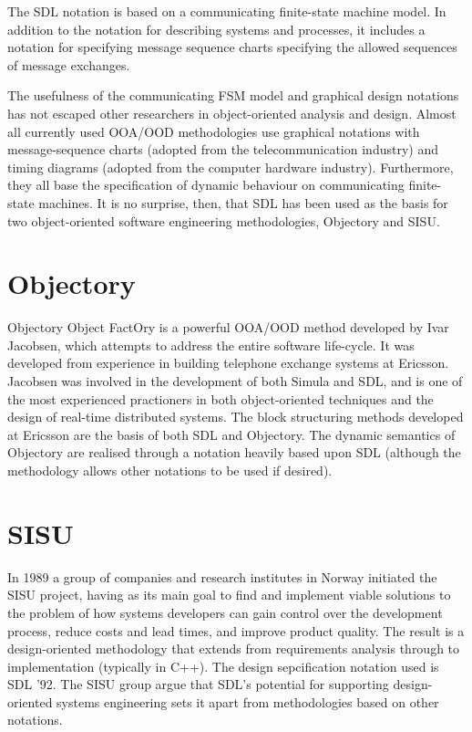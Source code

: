 The SDL notation is based on a communicating finite-state machine model.
In addition to the notation for describing systems and processes,
it includes a notation for specifying message sequence charts specifying the
allowed sequences of message exchanges. 

The usefulness of the communicating FSM model and
graphical design notations has not
escaped other researchers in object-oriented analysis and design. Almost
all currently used OOA/OOD methodologies use graphical notations with
message-sequence charts (adopted from the telecommunication industry)
and timing diagrams (adopted from the computer hardware industry).
Furthermore, they all base the specification of dynamic behaviour on
communicating finite-state machines.
It is no surprise, then, that SDL has been used as the basis for
two object-oriented software engineering methodologies, 
Objectory\cite{objectory} and SISU\cite{sisu}.

\section{Objectory}

Objectory {Object FactOry} is a powerful OOA/OOD method developed by Ivar 
Jacobsen, which attempts to address the entire software 
life-cycle. It was developed from experience in building telephone exchange 
systems at Ericsson. Jacobsen was involved in the development of both 
Simula and SDL, and is one of the most experienced practioners in both
object-oriented techniques and the design of real-time distributed 
systems. The block structuring methods developed at Ericsson are the 
basis of both SDL and Objectory.
The dynamic semantics of Objectory are realised through a notation
heavily based upon SDL (although the methodology allows
other notations to be used if desired).

\section{SISU}

In 1989 a group of companies and research institutes in Norway initiated
the SISU project, having as its main goal to find and implement viable
solutions to the problem of how systems developers can gain control over
the development process, reduce costs and lead times, and improve product
quality. The result is a design-oriented
methodology that extends from requirements analysis through to
implementation (typically in C++). The design sepcification notation
used is SDL '92. The SISU group argue that SDL's potential for supporting
design-oriented systems engineering sets it apart from methodologies
based on other notations.

